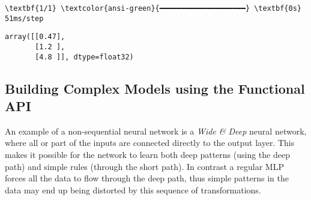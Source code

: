 \documentclass[12pt letter]{report}
\makeatletter
\newcommand{\boxspacing}{\kern\kvtcb@left@rule\kern\kvtcb@boxsep}
\newcommand{\prompt}[4]{
        {\ttfamily\llap{{\color{#2}[#3]:\hspace{3pt}#4}}\vspace{-\baselineskip}}
    }
\makeatother
\begin{document}
    \begin{Verbatim}[commandchars=\\\{\}]
\textbf{1/1} \textcolor{ansi-green}{━━━━━━━━━━━━━━━━━━━━} \textbf{0s} 51ms/step
    \end{Verbatim}

            \begin{tcolorbox}[breakable, size=fbox, boxrule=.5pt, pad at break*=1mm, opacityfill=0]
\prompt{Out}{outcolor}{25}{\boxspacing}
\begin{Verbatim}[commandchars=\\\{\}]
array([[0.47],
       [1.2 ],
       [4.8 ]], dtype=float32)
\end{Verbatim}
\end{tcolorbox}
        
\subsection{Building Complex Models using the Functional
API}\label{building-complex-models-using-the-functional-api}

An example of a non-sequential neural network is a \emph{Wide \& Deep}
neural network, where all or part of the inputs are connected directly
to the output layer. This makes it possible for the network to learn
both deep patterns (using the deep path) and simple rules (through the
short path). In contrast a regular MLP forces all the data to flow
through the deep path, thus simple patterns in the data may end up being
distorted by this sequence of transformations.
\end{document}
